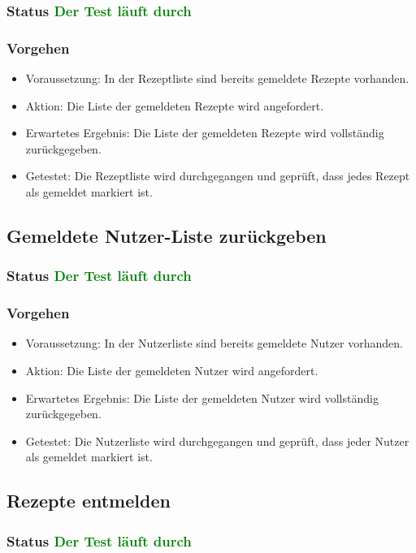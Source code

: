 \subsubsection{Status \textcolor{green}{ Der Test läuft durch} }
\subsubsection{Vorgehen}
\begin{itemize}
	\item Voraussetzung: In der Rezeptliste sind bereits gemeldete Rezepte vorhanden.
	\item Aktion: Die Liste der gemeldeten Rezepte wird angefordert.
	\item Erwartetes Ergebnis: Die Liste der gemeldeten Rezepte wird vollständig zurückgegeben.
	\item Getestet: Die Rezeptliste wird durchgegangen und geprüft, dass jedes Rezept als gemeldet markiert ist.
\end{itemize}



\subsection{Gemeldete Nutzer-Liste zurückgeben}
\subsubsection{Status \textcolor{green}{ Der Test läuft durch} }
\subsubsection{Vorgehen}
\begin{itemize}
	\item Voraussetzung: In der Nutzerliste sind bereits gemeldete Nutzer vorhanden.
	\item Aktion: Die Liste der gemeldeten Nutzer wird angefordert.
	\item Erwartetes Ergebnis: Die Liste der gemeldeten Nutzer wird vollständig zurückgegeben.
	\item Getestet: Die Nutzerliste wird durchgegangen und geprüft, dass jeder Nutzer als gemeldet markiert ist.
\end{itemize}


\subsection{Rezepte entmelden}
\subsubsection{Status \textcolor{green}{ Der Test läuft durch} }
